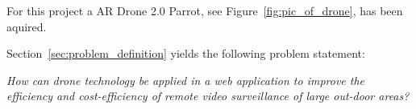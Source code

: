 For this project a AR Drone 2.0 Parrot, see Figure~\ref{fig:pic_of_drone}, has been aquired.

Section~\ref{sec:problem_definition} yields the following problem statement:

\textit{How can drone technology be applied in a web application to improve the efficiency and cost-efficiency of remote video surveillance of large out-door areas?}